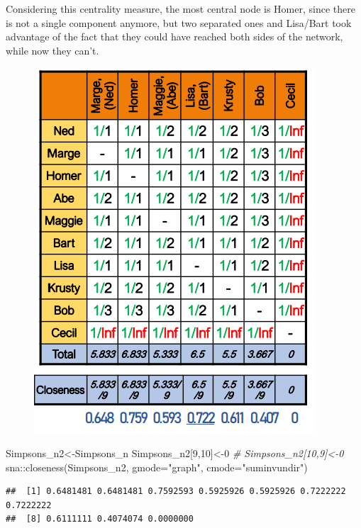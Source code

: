 \documentclass[
  notitlepage,
  onecolumn,
  openany]{book}
\newenvironment{Shaded}{\begin{snugshade}}{\end{snugshade}}
\newcommand{\AttributeTok}[1]{\textcolor[rgb]{0.77,0.63,0.00}{#1}}
\newcommand{\CommentTok}[1]{\textcolor[rgb]{0.56,0.35,0.01}{\textit{#1}}}
\newcommand{\DecValTok}[1]{\textcolor[rgb]{0.00,0.00,0.81}{#1}}
\newcommand{\FunctionTok}[1]{\textcolor[rgb]{0.00,0.00,0.00}{#1}}
\newcommand{\NormalTok}[1]{#1}
\newcommand{\OtherTok}[1]{\textcolor[rgb]{0.56,0.35,0.01}{#1}}
\newcommand{\SpecialCharTok}[1]{\textcolor[rgb]{0.00,0.00,0.00}{#1}}
\newcommand{\StringTok}[1]{\textcolor[rgb]{0.31,0.60,0.02}{#1}}
\begin{document}
Considering this centrality measure, the most central node is Homer, since there is not a single component anymore, but two separated ones and Lisa/Bart took advantage of the fact that they could have reached both sides of the network, while now they can't.

\begin{figure}[h!]

{\centering \includegraphics[width=0.5\linewidth]{images/04-Centrality/Untitled 3} 

}

\end{figure}

\begin{Shaded}
\begin{Highlighting}[]
\NormalTok{Simpsons\_n2}\OtherTok{\textless{}{-}}\NormalTok{Simpsons\_n}
\NormalTok{Simpsons\_n2[}\DecValTok{9}\NormalTok{,}\DecValTok{10}\NormalTok{]}\OtherTok{\textless{}{-}}\DecValTok{0}
\CommentTok{\# Simpsons\_n2[10,9]\textless{}{-}0}
\NormalTok{sna}\SpecialCharTok{::}\FunctionTok{closeness}\NormalTok{(Simpsons\_n2, }\AttributeTok{gmode=}\StringTok{"graph"}\NormalTok{, }\AttributeTok{cmode=}\StringTok{"suminvundir"}\NormalTok{)}
\end{Highlighting}
\end{Shaded}

\begin{verbatim}
##  [1] 0.6481481 0.6481481 0.7592593 0.5925926 0.5925926 0.7222222 0.7222222
##  [8] 0.6111111 0.4074074 0.0000000
\end{verbatim}
\end{document}
